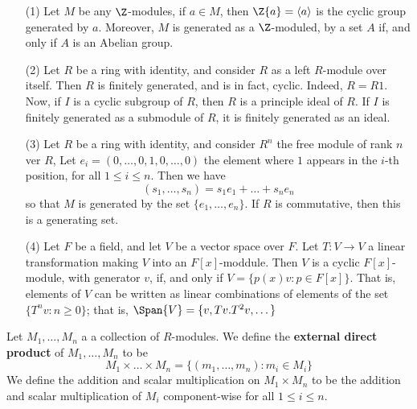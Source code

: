 \begin{example}\label{example_4.6}
    \begin{enumerate}
        \item[(1)] Let $M$ be any  $\Z$-modules, if  $a \in M$, then
            $\Z{a}=\langle a \rangle$ is the cyclic group generated by $a$.
            Moreover, $M$ is generated as a $\Z$-moduled, by a set $A$ if, and
            only if  $A$ is an Abelian group.

        \item[(2)] Let $R$ be a ring with identity, and consider  $R$ as a left
             $R$-module over itself. Then $R$ is finitely generated, and is
             in fact, cyclic. Indeed,  $R=R1$. Now, if $I$ is a cyclic subgroup
             of  $R$, then  $R$ is a principle ideal of  $R$. If  $I$ is
             finitely generated as a submodule of $R$, it is finitely generated
             as an ideal.

        \item[(3)] Let $R$ be a ring with identity, and consider  $R^n$ the free
            module of rank  $n$ ver  $R$, Let  $e_i=(0, \dots, 0,1,0, \dots, 0)$
            the element where $1$ appears in the  $i$-th position, for all  $1
            \leq i \leq n$. Then we have
            \begin{equation*}
                (s_1, \dots, s_n)=s_1e_1+\dots+s_ne_n
            \end{equation*}
            so that $M$ is generated by the set  $\{e_1, \dots, e_n\}$. If $R$
            is commutative, then this is a generating set.

        \item[(4)] Let $F$ be a field, and let  $V$ be a vector space over $F$.
            Let $T:V \xrightarrow{} V$ a linear transformation making $V$ into
            an  $F[x]$-moddule. Then $V$ is a cyclic  $F[x]$-module, with
            generator $v$, if, and only if  $V=\{p(x)v : p \in F[x]\}$. That is,
            elements of $V$ can be written as linear combinations of elements of
            the set
             $\{T^nv : n \geq 0\}$; that is, $\Span{V}=\{v,Tv.T^2v, \dots\}$
    \end{enumerate}
\end{example}

\begin{definition}
    Let $M_1, \dots, M_n$ a a collection of $R$-modules. We define the
    \textbf{external direct product} of $M_1, \dots, M_n$ to be
    \begin{equation*}
        M_1 \times \dots \times M_n=\{(m_1, \dots, m_n) : m_i \in M_i\}
    \end{equation*}
    We define the addition and scalar multiplication on $M_1 \times M_n$ to be
    the addition and scalar multiplication of $M_i$ component-wise for all  $1
    \leq i \leq n$.
\end{definition}

